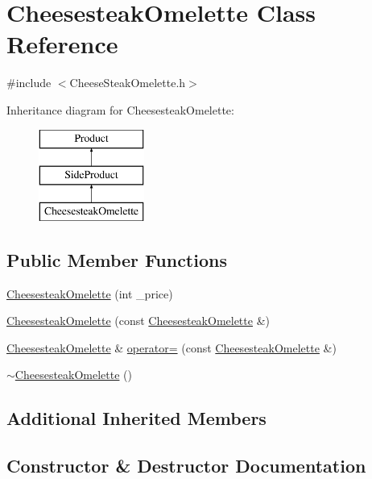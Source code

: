 \hypertarget{classCheesesteakOmelette}{}\section{Cheesesteak\+Omelette Class Reference}
\label{classCheesesteakOmelette}


{\ttfamily \#include $<$Cheese\+Steak\+Omelette.\+h$>$}

Inheritance diagram for Cheesesteak\+Omelette\+:\begin{figure}[H]
\begin{center}
\leavevmode
\includegraphics[height=3.000000cm]{classCheesesteakOmelette}
\end{center}
\end{figure}
\subsection*{Public Member Functions}
\begin{DoxyCompactItemize}
\item 
\mbox{\hyperlink{classCheesesteakOmelette_a7dfffbe81d746d3cac1ee22b517645a0}{Cheesesteak\+Omelette}} (int \+\_\+price)
\item 
\mbox{\hyperlink{classCheesesteakOmelette_ac57501f66bc9709e91d591a4fbc71ae7}{Cheesesteak\+Omelette}} (const \mbox{\hyperlink{classCheesesteakOmelette}{Cheesesteak\+Omelette}} \&)
\item 
\mbox{\hyperlink{classCheesesteakOmelette}{Cheesesteak\+Omelette}} \& \mbox{\hyperlink{classCheesesteakOmelette_a401bfe4f99b27dd34a045137c4449a9c}{operator=}} (const \mbox{\hyperlink{classCheesesteakOmelette}{Cheesesteak\+Omelette}} \&)
\item 
\mbox{\hyperlink{classCheesesteakOmelette_ae0aba90b4a81eedbebe21ab00bd398a7}{$\sim$\+Cheesesteak\+Omelette}} ()
\end{DoxyCompactItemize}
\subsection*{Additional Inherited Members}


\subsection{Constructor \& Destructor Documentation}
\mbox{\label{classCheesesteakOmelette_a7dfffbe81d746d3cac1ee22b517645a0}} 
